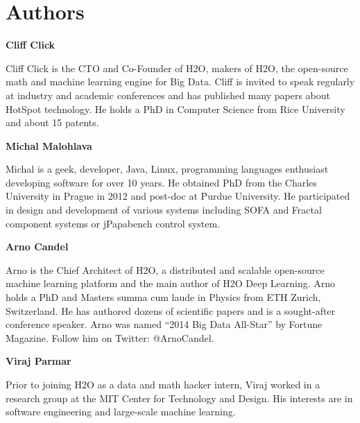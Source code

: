 

\newpage

\section{Authors}

\textbf{Cliff Click}

Cliff Click is the CTO and Co-Founder of H2O, makers of H2O, the open-source math and machine learning engine for Big Data. Cliff is invited to speak regularly at industry and academic conferences and has published many papers about HotSpot technology. He holds a PhD in Computer Science from Rice University and about 15 patents.

\textbf{Michal Malohlava}

Michal is a geek, developer, Java, Linux, programming languages enthusiast developing software for over 10 years. He obtained PhD from the Charles University in Prague in 2012 and post-doc at Purdue University. He participated in design and development of various systems including SOFA and Fractal component systems or jPapabench control system.

\textbf{Arno Candel}

Arno is the Chief Architect of H2O, a distributed and scalable open-source machine learning platform and the main author of H2O Deep Learning.  Arno holds a PhD and Masters summa cum laude in Physics from ETH Zurich, Switzerland. He has authored dozens of scientific papers and is a sought-after conference speaker. Arno was named “2014 Big Data All-Star” by Fortune Magazine. Follow him on Twitter: @ArnoCandel.

\textbf{Viraj Parmar}

Prior to joining H2O as a data and math hacker intern, Viraj worked in a research group at the MIT Center for Technology and Design. His interests are in software engineering and large-scale machine learning. 


